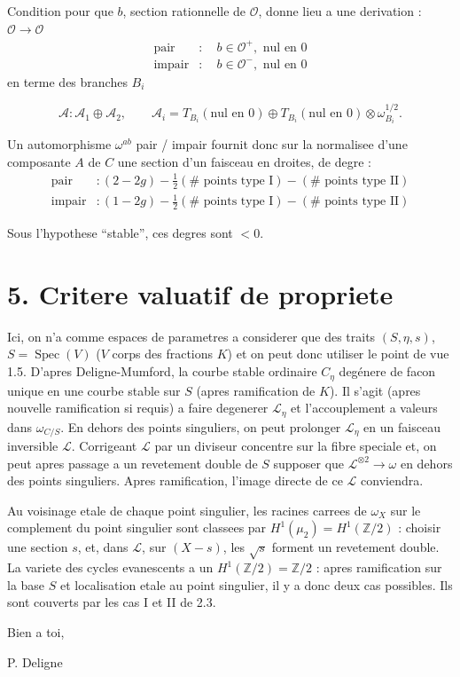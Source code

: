 \documentclass[11pt,a4paper]{article}
\theoremstyle{plain}
\theoremstyle{definition}
\DeclareMathOperator{\Spec}{Spec}
\begin{document}
Condition pour que $b$, section rationnelle de $\mathcal{O}$, donne lieu a une derivation : $\mathcal{O} \to \mathcal{O}$
\[
\begin{aligned}
\text{pair} &: \quad b \in \mathcal{O}^+, \text{ nul en } 0 \\
\text{impair} &: \quad b \in \mathcal{O}^-, \text{ nul en } 0
\end{aligned}
\]
\hfill en terme des branches $B_i$

\[
\mathcal{A} : \mathcal{A}_1 \oplus \mathcal{A}_2, \qquad \mathcal{A}_i = T_{B_i}(\text{nul en } 0) \oplus T_{B_i}(\text{nul en } 0) \otimes \omega_{B_i}^{1/2}.
\]

Un automorphisme $\omega^{ab}$ pair / impair fournit donc sur la normalisee d'une composante $A$ de $C$ une section d'un faisceau en droites, de degre :
\[
\begin{aligned}
\text{pair} &: (2 - 2g) - \tfrac{1}{2}(\# \text{ points type I}) - (\# \text{ points type II}) \\
\text{impair} &: (1 - 2g) - \tfrac{1}{2}(\# \text{ points type I}) - (\# \text{ points type II})
\end{aligned}
\]

Sous l'hypothese ``stable'', ces degres sont $< 0$.

\newpage

\section*{5. Critere valuatif de propriete}

Ici, on n'a comme espaces de parametres a considerer que des traits $(S,\eta,s)$, $S = \Spec(V)$ ($V$ corps des fractions $K$) et on peut donc utiliser le point de vue 1.5. D'apres Deligne-Mumford, la courbe stable ordinaire $C_\eta$ degénere de facon unique en une courbe stable sur $S$ (apres ramification de $K$). Il s'agit (apres nouvelle ramification si requis) a faire degenerer $\mathcal{L}_\eta$ et l'accouplement a valeurs dans $\omega_{C/S}$. En dehors des points singuliers, on peut prolonger $\mathcal{L}_\eta$ en un faisceau inversible $\mathcal{L}$. Corrigeant $\mathcal{L}$ par un diviseur concentre sur la fibre speciale et, on peut apres passage a un revetement double de $S$ supposer que $\mathcal{L}^{\otimes 2} \to \omega$ en dehors des points singuliers. Apres ramification, l'image directe de ce $\mathcal{L}$ conviendra.

Au voisinage etale de chaque point singulier, les racines carrees de $\omega_X$ sur le complement du point singulier sont classees par $H^1(\mu_2) = H^1(\mathbb{Z}/2)$ : choisir une section $s$, et, dans $\mathcal{L}$, sur $(X-s)$, les $\sqrt{s}$ forment un revetement double. La variete des cycles evanescents a un $H^1(\mathbb{Z}/2) = \mathbb{Z}/2$ : apres ramification sur la base $S$ et localisation etale au point singulier, il y a donc deux cas possibles. Ils sont couverts par les cas I et II de 2.3.

\vspace{1cm}

\begin{flushright}
Bien a toi,

\vspace{0.5cm}

P. Deligne
\end{flushright}
\end{document}
